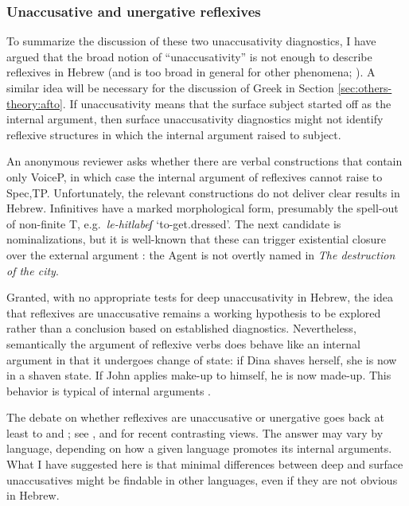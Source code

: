 		\subsubsection{Unaccusative and unergative reflexives}
To summarize the discussion of these two unaccusativity diagnostics, I have argued that the broad notion of ``unaccusativity'' is not enough to describe reflexives in Hebrew (and is too broad in general for other phenomena; \citealt{irwinphd,alexiadou11oup,alexiadou14thli}). A similar idea will be necessary for the discussion of Greek in Section \ref{sec:others-theory:afto}. If unaccusativity means that the surface subject started off as the internal argument, then surface unaccusativity diagnostics might not identify reflexive structures in which the internal argument raised to subject.

An anonymous reviewer asks whether there are verbal constructions that contain only VoiceP, in which case the internal argument of reflexives cannot raise to Spec,TP. Unfortunately, the relevant constructions do not deliver clear results in Hebrew. Infinitives have a marked morphological form, presumably the spell-out of non-finite T, e.g.~\emph{le-hitlabeʃ} `to-get.dressed'. The next candidate is nominalizations, but it is well-known that these can trigger existential closure over the external argument \citep[31]{grimshaw90,bruening13}: the Agent is not overtly named in \emph{The destruction of the city}.

Granted, with no appropriate tests for deep unaccusativity in Hebrew, the idea that reflexives are unaccusative remains a working hypothesis to be explored rather than a conclusion based on established diagnostics. Nevertheless, semantically the argument of reflexive verbs does behave like an internal argument in that it undergoes change of state: if Dina shaves herself, she is now in a shaven state. If John applies make-up to himself, he is now made-up. This behavior is typical of internal arguments \citep{dowty91,alexiadouschaefer13wccfl}.

The debate on whether reflexives are unaccusative or unergative goes back at least to \cite{kayne75} and \cite{marantz84}; see \cite{chierchia04}, \cite{doronrappaporthovav09} and \cite{sportiche14} for recent contrasting views. The answer may vary by language, depending on how a given language promotes its internal arguments. What I have suggested here is that minimal differences between deep and surface unaccusatives might be findable in other languages, even if they are not obvious in Hebrew.

